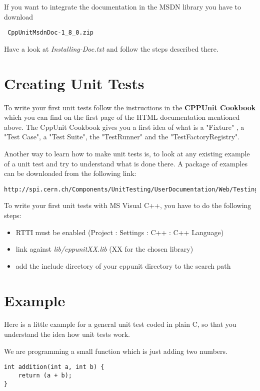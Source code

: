 If you want to integrate the documentation in the MSDN library you have to
download \begin{verbatim} CppUnitMsdnDoc-1_8_0.zip \end{verbatim}
Have a look at \textit{Installing-Doc.txt} and follow the steps described there.


\section{Creating Unit Tests}

To write your first unit tests follow the instructions in the
\textbf{CPPUnit Cookbook} which you can find on the first page of
the HTML documentation mentioned above. The CppUnit Cookbook gives
you a first idea of what is a "Fixture" , a "Test Case", a "Test
Suite", the "TestRunner" and the "TestFactoryRegistry".

Another way to learn how to make unit tests is, to look at any
existing example of a unit test and try to understand what is done
there. A package of examples can be downloaded from the following
link:
\begin{verbatim}
http://spi.cern.ch/Components/UnitTesting/UserDocumentation/Web/Testing_examples.tar.gz
\end{verbatim}

To write your first unit tests with MS Visual C++, you have to do the following steps:
\begin{itemize}
\item RTTI must be enabled (Project : Settings : C++ : C++ Language)
\item link against \textit{lib/cppunitXX.lib} (XX for the chosen library)
\item add the include directory of your cppunit directory to the search path
\end{itemize}

\section{Example}

Here is a little example for a general unit test coded in plain C,
so that you understand the idea how unit tests work.

We are programming a small function which is just adding two
numbers.

\begin{verbatim}
int addition(int a, int b) {
    return (a + b);
}
\end{verbatim}

